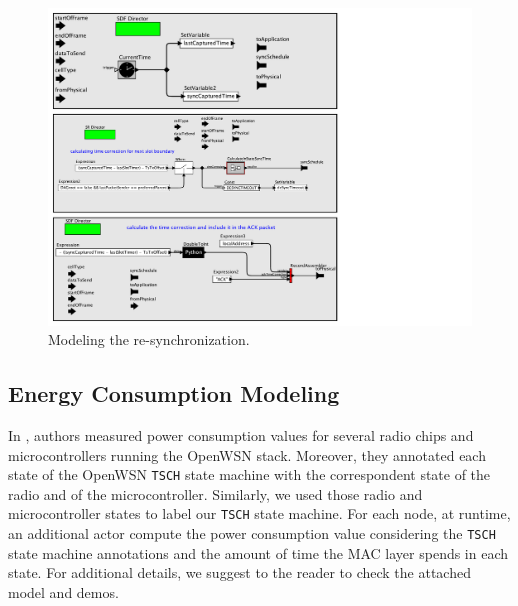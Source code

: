 \begin{figure}[t]
\centering
\includegraphics[width=0.8\columnwidth]{figures/PaperReSynchronization}
\caption{\small Modeling the re-synchronization.}
\label{fig:timeCorrection}
\end{figure}


\subsection{Energy Consumption Modeling}
\label{sec:energy}

In \cite{vilajosana2013realistic}, authors measured power consumption values  for several radio chips and microcontrollers running the OpenWSN stack. Moreover, they annotated each state of the OpenWSN \texttt{TSCH} state machine with the correspondent state of the radio and of the microcontroller.
Similarly, we used those radio and microcontroller states to label our \texttt{TSCH} state machine.
For each node, at runtime, an additional actor compute the power consumption value considering the \texttt{TSCH} state machine annotations and the amount of time the MAC layer spends in each state.
For additional details, we suggest to the reader to check the attached model and demos.



